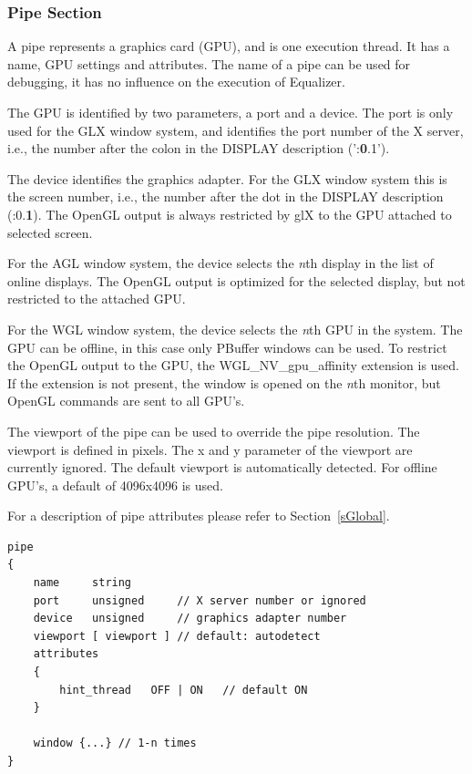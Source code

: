 \documentclass[10pt,a4]{scrartcl}
\newcommand{\sref}[1]{Section~\ref{#1}}
\begin{document}
\subsubsection{Pipe Section}

A pipe represents a graphics card (GPU), and is one execution thread. It
has a name, GPU settings and attributes. The name of a pipe can be used
for debugging, it has no influence on the execution of Equalizer.

The GPU is identified by two parameters, a port and a device. The port
is only used for the GLX window system, and identifies the port number
of the X server, i.e., the number after the colon in the DISPLAY
description (':\textbf{0}.1').

The device identifies the graphics adapter. For the GLX window system
this is the screen number, i.e., the number after the dot in the DISPLAY
description (:0.\textbf{1}). The OpenGL output is always restricted by
glX to the GPU attached to selected screen.

For the AGL window system, the device selects the \textit{n}th display
in the list of online displays. The OpenGL output is optimized for the
selected display, but not restricted to the attached GPU.

For the WGL window system, the device selects the \textit{n}th GPU in
the system. The GPU can be offline, in this case only PBuffer windows
can be used. To restrict the OpenGL output to the GPU, the
\textsf{WGL\_NV\_gpu\_affinity} extension is used. If the extension is
not present, the window is opened on the \textit{n}th monitor, but
OpenGL commands are sent to all GPU's.

The viewport of the pipe can be used to override the pipe
resolution. The viewport is defined in pixels. The x and y parameter of
the viewport are currently ignored. The default viewport is
automatically detected. For offline GPU's, a default of 4096x4096 is
used.

For a description of pipe attributes please refer to \sref{sGlobal}.

{\footnotesize\begin{lstlisting}
pipe
{
    name     string
    port     unsigned     // X server number or ignored
    device   unsigned     // graphics adapter number
    viewport [ viewport ] // default: autodetect
    attributes
    {
        hint_thread   OFF | ON   // default ON
    }

    window {...} // 1-n times
}
\end{lstlisting}}
\end{document}
